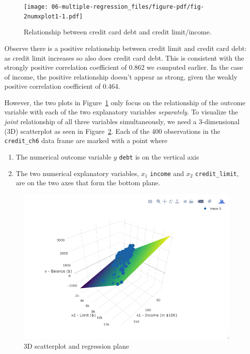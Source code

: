 \documentclass[
  letterpaper,
  DIV=11,
  numbers=noendperiod]{scrreprt}
\providecommand{\tightlist}{%
  \setlength{\itemsep}{0pt}\setlength{\parskip}{0pt}}\usepackage{longtable,booktabs,array}
\theoremstyle{definition}
\theoremstyle{remark}
\begin{document}
\begin{figure}

{\centering \texttt{[image: 06-multiple-regression\_files/figure-pdf/fig-2numxplot1-1.pdf]}

}

\caption{\label{fig-2numxplot1}Relationship between credit card debt and
credit limit/income.}

\end{figure}

Observe there is a positive relationship between credit limit and credit
card debt: as credit limit increases so also does credit card debt. This
is consistent with the strongly positive correlation coefficient of
0.862 we computed earlier. In the case of income, the positive
relationship doesn't appear as strong, given the weakly positive
correlation coefficient of 0.464.

However, the two plots in Figure~\ref{fig-2numxplot1} only focus on the
relationship of the outcome variable with each of the two explanatory
variables \emph{separately}. To visualize the \emph{joint} relationship
of all three variables simultaneously, we need a 3-dimensional (3D)
scatterplot as seen in Figure~\ref{fig-3D-scatterplot}. Each of the 400
observations in the \texttt{credit\_ch6} data frame are marked with a
point where

\begin{enumerate}
\def\labelenumi{\arabic{enumi}.}
\tightlist
\item
  The numerical outcome variable \(y\) \texttt{debt} is on the vertical
  axis
\item
  The two numerical explanatory variables, \(x_1\) \texttt{income} and
  \(x_2\) \texttt{credit\_limit}, are on the two axes that form the
  bottom plane.
\end{enumerate}

\begin{figure}

{\centering \includegraphics{images/credit_card_balance_regression_plane.png}

}

\caption{\label{fig-3D-scatterplot}3D scatterplot and regression plane}

\end{figure}
\end{document}

